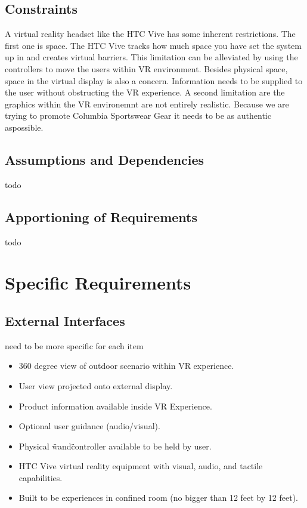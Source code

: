 \documentclass[10pt, oneside,onecolumn,draftclsnofoot]{IEEEtran}
\begin{document}
\subsection{Constraints}
A virtual reality headset like the HTC Vive has some inherent restrictions.
The first one is space. The HTC Vive tracks how much space you have set the
system up in and creates virtual barriers. This limitation can be alleviated by
using the controllers to move the users within VR environment. Besides physical
space, space in the virtual display is also a concern. Information needs to be
supplied to the user without obstructing the VR experience. A second
limitation are the graphics within the VR environemnt are not entirely
realistic. Because we are trying to promote Columbia Sportswear Gear it needs
to be as authentic aspossible.

\subsection{Assumptions and Dependencies}
todo

\subsection{Apportioning of Requirements}
todo

\section{Specific Requirements}
\subsection{External Interfaces}
need to be more specific for each item
\begin{itemize}
  \item 360 degree view of outdoor scenario within VR experience.
  \item User view projected onto external display.
  \item Product information available inside VR Experience.
  \item Optional user guidance (audio/visual).
  \item Physical \"wand\" controller available to be held by user.
  \item HTC Vive virtual reality equipment with visual, audio, and tactile capabilities.
  \item Built to be experiences in confined room (no bigger than 12 feet by 12 feet).
\end{itemize}
\end{document}
